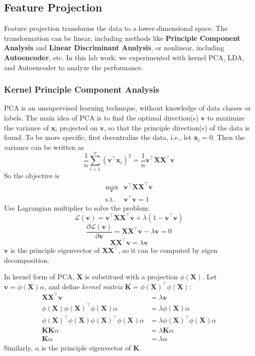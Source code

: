\documentclass[journal]{IEEEtran}
\begin{document}
\subsection{Feature Projection}
Feature projection transforms the data to a lower-dimensional space. The transformation can be linear, including methods like \textbf{Principle Component Analysis} and \textbf{Linear Discriminant Analysis}, or nonlinear, including \textbf{Autoencoder}, etc. In this lab work, we experimented with kernel PCA, LDA, and Autoencoder to analyze the performance.
~\\
\subsubsection{Kernel Principle Component Analysis}
PCA is an unsupervised learning technique, without knowledge of data classes or labels. The main idea of PCA is to find the optimal direction(s) $\mathbf v$ to maximize the variance of $\mathbf x_i$ projected on $\mathbf v$, so that the principle direction(s) of the data is found. To be more specific, first decentralize the data, i.e., let $\bar {\mathbf x}_i = 0$. Then the variance can be written as
$$
\frac{1}{n}\sum_{i=1}^n (\mathbf v^\top \mathbf x_i)^2 = \frac{1}{n}\mathbf v^\top \mathbf X \mathbf X^\top \mathbf v
$$
So the objective is
$$
\begin{array}{rl}
\max_{\mathbf v} & \mathbf v^\top \mathbf X \mathbf X^\top \mathbf v \\
\mathrm{s.t.} & \mathbf v^\top \mathbf v = 1
\end{array}
$$
Use Lagrangian multiplier to solve the problem:
$$\mathcal L(\mathbf v) = \mathbf v^\top \mathbf X \mathbf X^\top \mathbf v + \lambda(1 - \mathbf v^\top \mathbf v)$$
$$\frac{\partial \mathcal L(\mathbf v)}{\partial \mathbf v} = \mathbf X\mathbf X^\top \mathbf v - \lambda \mathbf v = 0$$
$$\mathbf X\mathbf X^\top \mathbf v = \lambda \mathbf v
$$
$\mathbf v$ is the principle eigenvector of $\mathbf X\mathbf X^\top$, so it can be computed by eigen decomposition.

In kernel form of PCA, $\mathbf X$ is substitued with a projection $\phi(\mathbf X)$. Let $\mathbf v = \phi(\mathbf X)\alpha$, and define \emph{kernel matrix} $\mathbf K = \phi(\mathbf X)^\top \phi(\mathbf X)$:
\begin{align*}
\mathbf X\mathbf X^\top \mathbf v &= \lambda \mathbf v \\
\phi(\mathbf X)\phi(\mathbf X)^\top \phi(\mathbf X) \alpha &= \lambda \phi(\mathbf X) \alpha \\
\phi(\mathbf X)^\top\phi(\mathbf X)\phi(\mathbf X)^\top \phi(\mathbf X) \alpha &= \lambda \phi(\mathbf X)^\top\phi(\mathbf X) \alpha \\
\mathbf K \mathbf K \alpha &= \lambda \mathbf K\alpha \\
\mathbf K \alpha &= \lambda \alpha
\end{align*}
Similarly, $\alpha$ is the principle eigenvector of $\mathbf K$.
\end{document}
